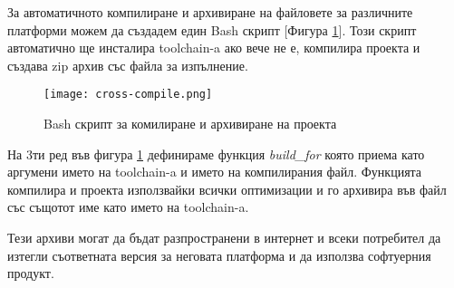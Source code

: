 За автоматичното компилиране и архивиране на файловете за различните платформи
можем да създадем един Bash скрипт [Фигура \ref{fig:cross-compile}]. Този
скрипт автоматично ще инсталира toolchain-a ако вече не е, компилира проекта и
създава zip архив със файла за изпълнение.

\begin{figure}[!htb]
  \texttt{[image: cross-compile.png]}
  \centering
  \caption{Bash скрипт за комилиране и архивиране на проекта}
  \label{fig:cross-compile}
\end{figure}

На 3ти ред във фигура \ref{fig:cross-compile} дефинираме функция
\textit{build\_for} която приема като аргумени името на toolchain-a и името на
компилирания файл. Функцията компилира и проекта използвайки всички оптимизации
и го архивира във файл със същотот име като името на toolchain-a.

Тези архиви могат да бъдат разпространени в интернет и всеки потребител да
изтегли съответната версия за неговата платформа и да използва софтуерния
продукт.


